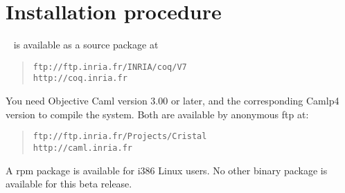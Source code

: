 \documentclass[11pt]{article}
\begin{document}

\section{Installation procedure}


\Coq~ is available as a source package at 

\begin{quote}
\verb|ftp://ftp.inria.fr/INRIA/coq/V7|\\
\verb|http://coq.inria.fr|
\end{quote}

You need Objective Caml version 3.00 or later, and the corresponding 
Camlp4 version to compile the system. Both are available by anonymous ftp
at:

\begin{quote}
\verb|ftp://ftp.inria.fr/Projects/Cristal|\\
\verb|http://caml.inria.fr|
\end{quote}

\noindent
%

A rpm package is available for i386 Linux users. No other binary
package is available for this beta release.

%

%
%
\end{document}

